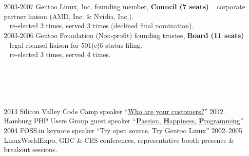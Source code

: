 \documentclass[]{friggeri-cv} %
\begin{document}
\section{{} {} {\normalsize {}~~}}
\begin{entrylist}
\entry
{2003-2007}
{Gentoo Linux, Inc.}
{founding member, {\textbf{\color{DarkGray}Council (7 seats)}}}
{{\tiny {}} ~ corporate partner liaison (AMD, Inc. \& Nvidia, Inc.).\\
{\tiny {}} ~ re-elected 3 times, served 3 times (declined final nomination).\\}
\entry
{2003-2006}
{Gentoo Foundation (Non-profit)}
{founding trustee, {\textbf{\color{DarkGray}Board (11 seats)}}}
{{\tiny {}} ~ legal counsel liaison for 501(c)6 status filing.\\
{\tiny {}} ~ re-elected 3 times, served 4 times.}
\end{entrylist}
\section{{} {} {\normalsize {}~~}}

\begin{entrylist}
\entry
{2013}
{Silicon Valley Code Camp}
{speaker}
{``\href{http://www.siliconvalley-codecamp.com/Session/2013/who-are-your-customers}{Who are your customers?}''}
\entry
{2012}
{Hamburg PHP Users Group}
{guest speaker}
{``\href{https://speakerdeck.com/seemantk/developing-with-passion}{\textbf{P}assion, \textbf{H}appiness, \textbf{P}rogramming}''}
\entry
{2004}
{FOSS.in}
{keynote speaker}
{``Try open source, Try Gentoo Linux''}
\entry
{2002--2005}
{LinuxWorldExpo, GDC \& CES conferences.}
{representative}
{booth presence \& breakout sessions.}
\end{entrylist}
\end{document}
